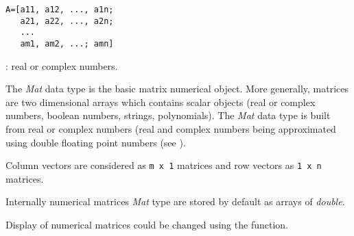 
\begin{mandesc}
\end{mandesc}
\begin{calling_sequence}
\begin{verbatim}
A=[a11, a12, ..., a1n;
   a21, a22, ..., a2n;
   ...
   am1, am2, ...; amn]
\end{verbatim}
\end{calling_sequence}
\begin{parameters}
  \begin{varlist}
    : real or complex numbers.
  \end{varlist}
\end{parameters}

\begin{mandescription}

The \emph{Mat} data type is the basic matrix numerical object. 
More generally, matrices are two dimensional arrays which contains
scalar objects (real or complex numbers, boolean numbers, strings,
polynomials). The \emph{Mat} data type is built from real or complex
numbers (real and complex numbers being approximated using
double floating point numbers (see ).

Column vectors are considered as \verb!m x 1! matrices and row vectors
as \verb!1 x n! matrices.

Internally numerical matrices \emph{Mat} type are stored by default as 
arrays of \emph{double}.

Display of numerical matrices could be changed using the  function.
\end{mandescription}

